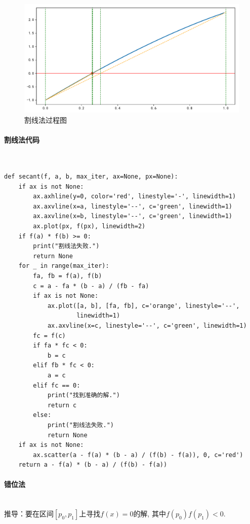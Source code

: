 \begin{figure}[H]
	\centering
	\caption{割线法过程图}
	\includegraphics[width=.87\linewidth]{fig11.pdf}
\end{figure}

\paragraph{割线法代码}
~\\
\begin{verbatim}
def secant(f, a, b, max_iter, ax=None, px=None):
    if ax is not None:
        ax.axhline(y=0, color='red', linestyle='-', linewidth=1)
        ax.axvline(x=a, linestyle='--', c='green', linewidth=1)
        ax.axvline(x=b, linestyle='--', c='green', linewidth=1)
        ax.plot(px, f(px), linewidth=2)
    if f(a) * f(b) >= 0:
        print("割线法失败.")
        return None
    for _ in range(max_iter):
        fa, fb = f(a), f(b)
        c = a - fa * (b - a) / (fb - fa)
        if ax is not None:
            ax.plot([a, b], [fa, fb], c='orange', linestyle='--', 
                    linewidth=1)
            ax.axvline(x=c, linestyle='--', c='green', linewidth=1)
        fc = f(c)
        if fa * fc < 0:
            b = c
        elif fb * fc < 0:
            a = c
        elif fc == 0:
            print("找到准确的解.")
            return c
        else:
            print("割线法失败.")
            return None
    if ax is not None:
        ax.scatter(a - f(a) * (b - a) / (f(b) - f(a)), 0, c='red')
    return a - f(a) * (b - a) / (f(b) - f(a))
\end{verbatim}

\paragraph{错位法}
~\\
推导：要在区间$\left[p_0,p_1 \right]$上寻找$f\left(x\right) = 0$的解, 其中$f\left(p_0 \right) f\left(p_1 \right) < 0$.


